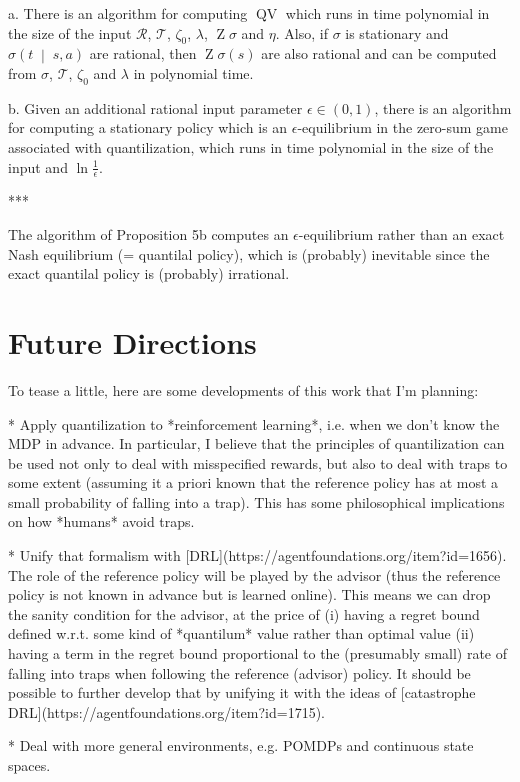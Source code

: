 \documentclass[a4paper]{article}
\newcommand{\APM}[2]{\left(#1\;\middle\vert\;#2\right)}
\newcommand{\T}{\mathcal{T}}
\newcommand{\R}{\mathcal{R}}
\newcommand{\QV}{\operatorname{QV}}
\DeclareMathOperator{\Z}{Z}
\begin{document}
a. There is an algorithm for computing $\QV$ which runs in time polynomial in the size of the input $\R$, $\T$, $\zeta_0$, $\lambda$, $\Z\sigma$ and $\eta$. Also, if $\sigma$ is stationary and $\sigma\APM{t}{s,a}$ are rational, then $\Z{\sigma}(s)$ are also rational and can be computed from $\sigma$, $\T$, $\zeta_0$ and $\lambda$ in polynomial time.

b. Given an additional rational input parameter $\epsilon\in(0,1)$, there is an algorithm for computing a stationary policy which is an $\epsilon$-equilibrium in the zero-sum game associated with quantilization, which runs in time polynomial in the size of the input and $\ln\frac{1}{\epsilon}$.

***

The algorithm of Proposition 5b computes an $\epsilon$-equilibrium rather than an exact Nash equilibrium (= quantilal policy), which is (probably) inevitable since the exact quantilal policy is (probably) irrational.

\section{Future Directions}

To tease a little, here are some developments of this work that I'm planning:

* Apply quantilization to *reinforcement learning*, i.e. when we don't know the MDP in advance. In particular, I believe that the principles of quantilization can be used not only to deal with misspecified rewards, but also to deal with traps to some extent (assuming it a priori known that the reference policy has at most a small probability of falling into a trap). This has some philosophical implications on how *humans* avoid traps.

* Unify that formalism with [DRL](https://agentfoundations.org/item?id=1656). The role of the reference policy will be played by the advisor (thus the reference policy is not known in advance but is learned online). This means we can drop the sanity condition for the advisor, at the price of (i) having a regret bound defined w.r.t. some kind of *quantilum* value rather than optimal value (ii) having a term in the regret bound proportional to the (presumably small) rate of falling into traps when following the reference (advisor) policy. It should be possible to further develop that by unifying it with the ideas of [catastrophe DRL](https://agentfoundations.org/item?id=1715).

* Deal with more general environments, e.g. POMDPs and continuous state spaces.
\end{document}
